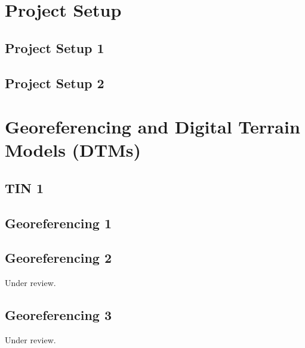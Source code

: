 \documentclass{scrartcl}
\begin{document}
\tableofcontents
\clearpage

\section{Project Setup}

\subsection{Project Setup 1}
\label{sec:project_setup_1}
\clearpage

\subsection{Project Setup 2}
\label{sec:project_setup_2}
\clearpage

\section{Georeferencing and Digital Terrain Models (DTMs)}

\subsection{TIN 1}
\label{sec:tin_1}
\clearpage

\subsection{Georeferencing 1}
\label{sec:georeferencing_1}
\clearpage

\subsection{Georeferencing 2}
\label{sec:georeferencing_2}
Under review.%
\clearpage

\subsection{Georeferencing 3}
\label{sec:georeferencing_3}
Under review.%
\clearpage
\end{document}
